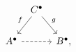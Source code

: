 \documentclass{standalone}
\newcommand{\bdot}{\bullet}
\begin{document}
$\displaystyle  \begin{tikzcd}[column sep = 0.5em] & \arrow[swap]{ld}{f} C^\bdot \arrow{rd}{g} & \\ A^\bdot \arrow[dashed]{rr} & & B^\bdot , \end{tikzcd} $
\end{document}
